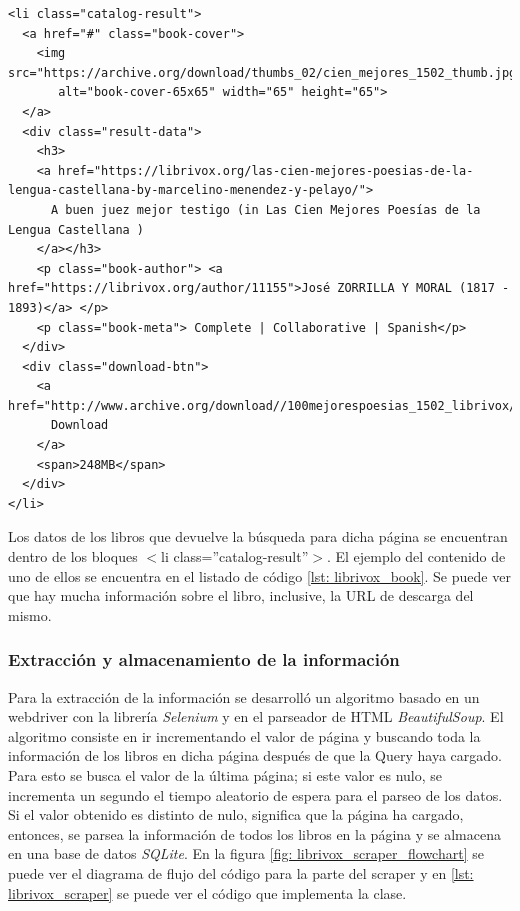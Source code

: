 \begin{lstlisting}[style=HTML,basicstyle=\tiny\ttfamily, caption={Ejemplo de la información contenida para uno de los libros},captionpos=b, label={lst: librivox_book}]
<li class="catalog-result">
  <a href="#" class="book-cover">
    <img src="https://archive.org/download/thumbs_02/cien_mejores_1502_thumb.jpg"
       alt="book-cover-65x65" width="65" height="65">
  </a>
  <div class="result-data">
    <h3>
    <a href="https://librivox.org/las-cien-mejores-poesias-de-la-lengua-castellana-by-marcelino-menendez-y-pelayo/">
      A buen juez mejor testigo (in Las Cien Mejores Poesías de la Lengua Castellana )
    </a></h3>
    <p class="book-author"> <a href="https://librivox.org/author/11155">José ZORRILLA Y MORAL (1817 - 1893)</a> </p>
    <p class="book-meta"> Complete | Collaborative | Spanish</p>
  </div>	
  <div class="download-btn">
    <a href="http://www.archive.org/download//100mejorespoesias_1502_librivox/100mejorespoesias_1502_librivox_64kb_mp3.zip">
      Download
    </a>
    <span>248MB</span>
  </div>
</li>
\end{lstlisting}
Los datos de los libros que devuelve la búsqueda para dicha página se encuentran dentro de los bloques \textcolor{editorBlue}{$<$}\textcolor{editorPink}{li class}\textcolor{editorBlue}{=}\textcolor{editorPurple}{''catalog-result''}\textcolor{editorBlue}{$>$}. El ejemplo del contenido de uno de ellos se encuentra en el listado de código \ref{lst: librivox_book}. Se puede ver que hay mucha información sobre el libro, inclusive, la \gls{URL} de descarga del mismo.
\subsubsection{Extracción y almacenamiento de la información}
Para la extracción de la información se desarrolló un algoritmo basado en un webdriver con la librería \textit{Selenium} y en el parseador de \gls{HTML} \textit{BeautifulSoup}. El algoritmo consiste en ir incrementando el valor de página y buscando toda la información de los libros en dicha página después de que la Query haya cargado. Para esto se busca el valor de la última página; si este valor es nulo, se incrementa un segundo el tiempo aleatorio de espera para el parseo de los datos. Si el valor obtenido es distinto de nulo, significa que la página ha cargado, entonces, se parsea la información de todos los libros en la página y se almacena en una base de datos \textit{SQLite}. En la figura \ref{fig: librivox_scraper_flowchart} se puede ver el diagrama de flujo del código para la parte del scraper y en \ref{lst: librivox_scraper} se puede ver el código que implementa la clase.

